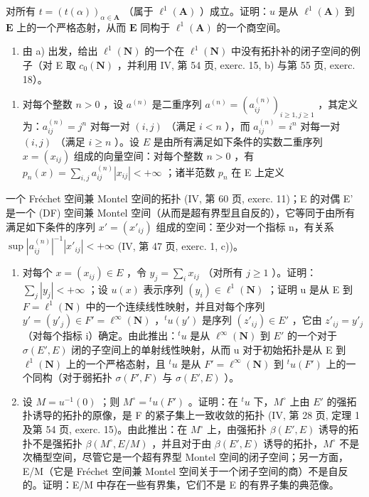 对所有 \(t = (t(\alpha))_{\alpha \in \mathbf{A}}\) （属于 \(\ell^1 (\mathbf{A})\) ）成立。证明：\(u\) 是从 \(\ell^1 (\mathbf{A})\) 到 \(\mathbf{E}\) 上的一个严格态射，从而 \(\mathbf{E}\) 同构于 \(\ell^1 (\mathbf{A})\) 的一个商空间。

\begin{enumerate}
\def\labelenumi{\alph{enumi})}
\setcounter{enumi}{1}
\tightlist
\item
  由 a) 出发，给出 \(\ell^{1}(\mathbf{N})\) 的一个在 \(\ell^{1}(\mathbf{N})\) 中没有拓扑补的闭子空间的例子（对 E 取 \(c_{0}(\mathbf{N})\) ，并利用 IV, 第 54 页, exerc. 15, b) 与第 55 页, exerc. 18）。
\end{enumerate}

\begin{enumerate}
\def\labelenumi{\arabic{enumi})}
\setcounter{enumi}{7}
\tightlist
\item
  对每个整数 \(n > 0\) ，设 \(a^{(n)}\) 是二重序列 \(a^{(n)} = (a_{ij}^{(n)})_{i\geqslant 1,j\geqslant 1}\) ，其定义为：\(a_{ij}^{(n)} = j^n\) 对每一对 \((i,j)\) （满足 \(i < n\) ），而 \(a_{ij}^{(n)} = i^n\) 对每一对 \((i,j)\) （满足 \(i\geqslant n\) ）。设 \(E\) 是由所有满足如下条件的实数二重序列 \(x = (x_{ij})\) 组成的向量空间：对每个整数 \(n > 0\) ，有 \(p_n(x) = \sum_{i,j}a_{ij}^{(n)}|x_{ij}| < +\infty\) ；诸半范数 \(p_n\) 在 E 上定义
\end{enumerate}

一个 Fréchet 空间兼 Montel 空间的拓扑 (IV, 第 60 页, exerc. 11)；E 的对偶 E' 是一个 (DF) 空间兼 Montel 空间（从而是超有界型且自反的），它等同于由所有满足如下条件的序列 \(x' = (x'_{ij})\) 组成的空间：至少对一个指标 n，有关系 \(\sup |a_{ij}^{(n)}|^{-1} |x'_{ij}| < +\infty\) (IV, 第 47 页, exerc. 1, c))。

\begin{enumerate}
\def\labelenumi{\alph{enumi})}
\item
  对每个 \(x = (x_{ij}) \in E\) ，令 \(y_j = \sum_i x_{ij}\) （对所有 \(j \geqslant 1\) ）。证明：\(\sum_j |y_j| < +\infty\) ；设 \(u(x)\) 表示序列 \((y_i) \in \ell^1(\mathbf{N})\) ；证明 u 是从 E 到 \(F = \ell^1(\mathbf{N})\) 中的一个连续线性映射，并且对每个序列 \(y' = (y'_j) \in F' = \ell^\infty(\mathbf{N})\) ，\(^t u(y')\) 是序列 \((z'_{ij}) \in E'\) ，它由 \(z'_{ij} = y'_j\) （对每个指标 i）确定。由此推出：\(^t u\) 是从 \(\ell^\infty(\mathbf{N})\) 到 \(E'\) 的一个对于 \(\sigma(E', E)\) 闭的子空间上的单射线性映射，从而 u 对于初始拓扑是从 E 到 \(\ell^1(\mathbf{N})\) 上的一个严格态射，且 \(^t u\) 是从 \(F' = \ell^\infty(\mathbf{N})\) 到 \(^t u(F')\) 上的一个同构（对于弱拓扑 \(\sigma(F', F)\) 与 \(\sigma(E', E)\) ）。
\item
  设 \(M = u^{-1}(0)\) ；则 \(M^{\circ} = {}^{t}u(F')\) 。证明：在 \({}^{t}u\) 下，\(M^{\circ}\) 上由 \(E'\) 的强拓扑诱导的拓扑的原像，是 F 的紧子集上一致收敛的拓扑 (IV, 第 28 页, 定理 1 及第 54 页, exerc. 15)。由此推出：在 \(M^{\circ}\) 上，由强拓扑 \(\beta(E', E)\) 诱导的拓扑不是强拓扑 \(\beta(M^{\circ}, E/M)\) ，并且对于由 \(\beta(E', E)\) 诱导的拓扑，\(M^{\circ}\) 不是次桶型空间，尽管它是一个超有界型 Montel 空间的闭子空间；另一方面，E/M（它是 Fréchet 空间兼 Montel 空间关于一个闭子空间的商）不是自反的。证明：E/M 中存在一些有界集，它们不是 E 的有界子集的典范像。
\end{enumerate}

